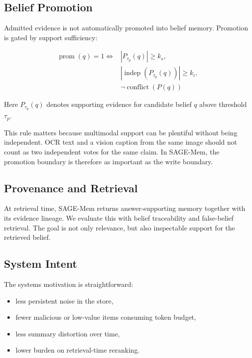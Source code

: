 \documentclass{article}
\begin{document}
\subsection{Belief Promotion}

Admitted evidence is not automatically promoted into belief memory. Promotion is gated by support sufficiency:

\begin{equation}
\begin{aligned}
\operatorname{prom}(q)=1 \iff {} & |P_{\tau_p}(q)| \ge k_s, \\
& |\operatorname{indep}(P_{\tau_p}(q))| \ge k_i, \\
& \neg \operatorname{conflict}(P(q))
\end{aligned}
\end{equation}

Here \(P_{\tau_p}(q)\) denotes supporting evidence for candidate belief \(q\) above threshold \(\tau_p\).

This rule matters because multimodal support can be plentiful without being independent. OCR text and a vision caption from the same image should not count as two independent votes for the same claim. In SAGE-Mem, the promotion boundary is therefore as important as the write boundary.

\subsection{Provenance and Retrieval}

At retrieval time, SAGE-Mem returns answer-supporting memory together with its evidence lineage. We evaluate this with belief traceability and false-belief retrieval. The goal is not only relevance, but also inspectable support for the retrieved belief.

\subsection{System Intent}

The systems motivation is straightforward:
\begin{itemize}
\item less persistent noise in the store,
\item fewer malicious or low-value items consuming token budget,
\item less summary distortion over time,
\item lower burden on retrieval-time reranking.
\end{itemize}
\end{document}
